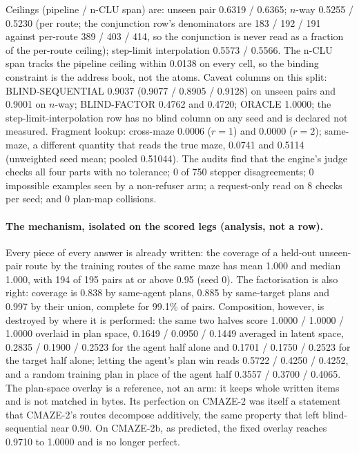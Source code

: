 \documentclass{article} %
\begin{document}
\noindent Ceilings (pipeline / n-CLU span) are: unseen pair 0.6319 / 0.6365; $n$-way 0.5255 / 0.5230
(per route; the conjunction row's denominators are 183 / 192 / 191 against per-route 389 / 403 /
414, so the conjunction is never read as a fraction of the per-route ceiling); step-limit interpolation
0.5573 / 0.5566. The n-CLU span tracks the pipeline ceiling within 0.0138 on every cell, so the
binding constraint is the address book, not the atoms. Caveat columns on this split:
BLIND-SEQUENTIAL 0.9037 (0.9077 / 0.8905 / 0.9128) on unseen pairs and 0.9001 on $n$-way;
BLIND-FACTOR 0.4762 and 0.4720; ORACLE 1.0000; the step-limit-interpolation row has no blind column on
any seed and is declared not measured. Fragment lookup: cross-maze 0.0006 ($r=1$) and 0.0000
($r=2$); same-maze, a different quantity that reads the true maze, 0.0741 and 0.5114 (unweighted
seed mean; pooled 0.51044). %
The audits find that the engine's judge checks all four parts with no tolerance; 0 of 750 stepper
disagreements; 0 impossible examples seen by a non-refuser arm; a request-only read on 8 checks
per seed; and 0 plan-map collisions. %

\paragraph{The mechanism, isolated on the scored legs (analysis, not a row).} Every piece of every
answer is already written: the coverage of a held-out unseen-pair route by the training routes of
the same maze has mean 1.000 and median 1.000, with 194 of 195 pairs at or above 0.95 (seed 0). The
factorisation is also right: coverage is 0.838 by same-agent plans, 0.885 by same-target plans and
0.997 by their union, complete for 99.1\% of pairs. Composition, however, is destroyed by where it
is performed: the same two halves score 1.0000 / 1.0000 / 1.0000 overlaid in plan space,
0.1649 / 0.0950 / 0.1449 averaged in latent space, 0.2835 / 0.1900 / 0.2523 for the agent half alone
and 0.1701 / 0.1750 / 0.2523 for the target half alone; letting the agent's plan win reads 0.5722 / 0.4250 / 0.4252, and a random
training plan in place of the agent half 0.3557 / 0.3700 / 0.4065. %
The plan-space overlay is a reference, not an arm: it keeps whole written items and is not matched
in bytes. Its perfection on CMAZE-2 was itself a statement that CMAZE-2's routes decompose
additively, the same property that left blind-sequential near 0.90. On CMAZE-2b, as predicted, the
fixed overlay reaches 0.9710 to 1.0000 and is no longer perfect. %
\end{document}
